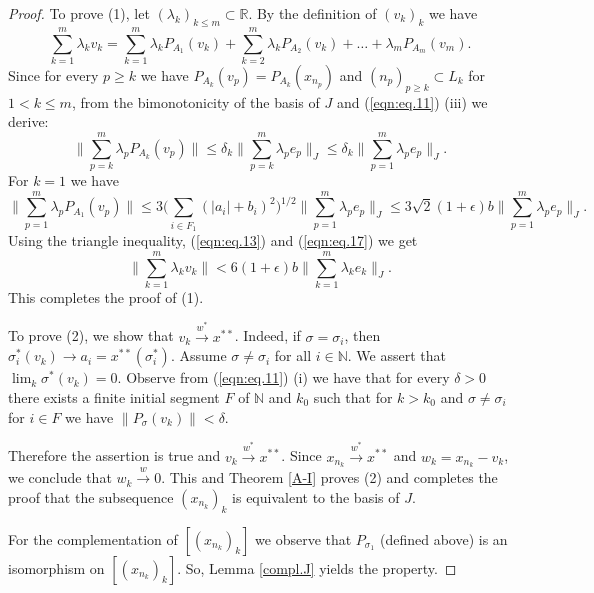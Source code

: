 \documentclass[10pt,a4paper]{amsart}
\newcommand{\N}{\mathbb{N}}
\newcommand{\R}{\mathbb{R}}
\newcommand{\s}{\sigma}
\begin{document}
\begin{proof}
To prove (1), let $(\lambda_k)_{k\leq m} \subset \R$. By the definition of $(v_k)_k$ we have
\begin{equation}\label{eqn:eq.14}
\sum_{k=1}^m \lambda_k v_k = \sum_{k=1}^m \lambda_k P_{A_1}(v_k) + \sum_{k=2}^m \lambda_k P_{A_2}(v_k) + \dots + \lambda_m P_{A_m}(v_m).
\end{equation}
Since for every $p\geq k$ we have $P_{A_k}(v_p) = P_{A_k}(x_{n_p})$ and $(n_p)_{p\geq k} \subset L_k$ for $1 < k\leq m$, from the bimonotonicity of the basis of $J$ and (\ref{eqn:eq.11}) (iii) we derive:
\begin{equation}\label{eqn:eq.15}
\Big\| \sum_{p=k}^m \lambda_pP_{A_k}(v_p) \Big\| \leq \delta_k \Big\| \sum_{p=k}^m \lambda_p e_p \Big\|_J \leq \delta_k \Big\| \sum_{p=1}^m \lambda_p e_p \Big\|_J.
\end{equation}
For $k=1$ we have
\begin{equation}\label{eqn:eq.17}
\Big\| \sum_{p=1}^m \lambda_pP_{A_1}(v_p) \Big\| \leq 3\Big( \sum_{i\in F_1} (|a_i| + b_i)^2\Big)^{1/2} \Big\| \sum_{p=1}^m \lambda_p e_p \Big\|_J \leq 3\sqrt{2} (1+ \epsilon) b\Big\| \sum_{p=1}^m \lambda_p e_p \Big\|_J.
\end{equation}
Using the triangle inequality, (\ref{eqn:eq.13}) and (\ref{eqn:eq.17}) we get
\begin{equation}\label{eqn:eq.16}
\Big\|\sum_{k=1}^m \lambda_k v_k \Big\| < 6(1+\epsilon)b \Big\|\sum_{k=1}^m \lambda_k e_k \Big\|_J.
\end{equation}
This completes the proof of (1).

To prove (2), we show that $v_k \xrightarrow{w^*} x^{**}$. Indeed, if $\s = \s_i$, then $\s_i^*(v_k) \to a_i = x^{**}(\s_i^*)$. Assume $\s\neq \s_i$ for all $i \in \N$.
We assert that $\lim_k \s^*(v_k) = 0$. Observe from (\ref{eqn:eq.11}) (i) we have that for every $\delta > 0$ there exists a finite initial segment $F$ of $\N$ and $k_0$ such that for $k>k_0$ and $\s \neq \s_i$ for $i\in F$ we have $\| P_\s(v_k)\| < \delta$.

Therefore the assertion is true and $v_k \xrightarrow{w^*} x^{**}$.
Since $x_{n_k} \xrightarrow{w^*} x^{**}$ and $w_k = x_{n_k} - v_k$, we conclude that $w_k \xrightarrow{w} 0$. This and Theorem \ref{A-I} proves (2) and completes the proof that the subsequence $(x_{n_k})_k$ is equivalent to the basis of $J$.

For the complementation of $[(x_{n_k})_k]$ we observe that $P_{\s_1}$ (defined above) is an isomorphism on $[(x_{n_k})_k]$. So, Lemma \ref{compl.J} yields the property.
\end{proof}
\end{document}
